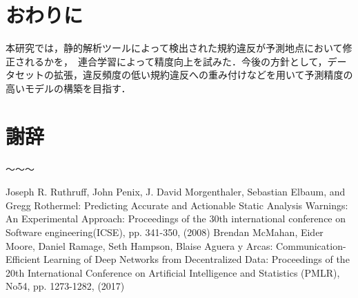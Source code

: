 \documentclass[uplatex,dvipdfmx,a4paper,twocolumn,base=11pt,jbase=11pt,ja=standard]{bxjsarticle}  %
\begin{document}




\section{おわりに}

本研究では，静的解析ツールによって検出された規約違反が予測地点において修正されるかを，　連合学習によって精度向上を試みた．今後の方針として，データセットの拡張，違反頻度の低い規約違反への重み付けなどを用いて予測精度の高いモデルの構築を目指す．






\section*{謝辞}
〜〜〜


\begin{thebibliography}{1}
     Joseph R. Ruthruff, John Penix, J. David Morgenthaler, Sebastian Elbaum, and Gregg Rothermel: Predicting Accurate and Actionable Static Analysis Warnings: An Experimental Approach: Proceedings of the 30th international conference on Software engineering(ICSE), pp. 341-350, (2008)
     Brendan McMahan, Eider Moore, Daniel Ramage, Seth Hampson, Blaise Aguera y Arcas: Communication-Efficient Learning of Deep Networks from Decentralized Data: Proceedings of the 20th International Conference on Artificial Intelligence and Statistics (PMLR), No54, pp. 1273-1282, (2017)
\end{thebibliography}





%
\end{document}
